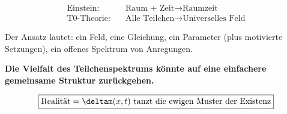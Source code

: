 	\begin{align}
		\text{Einstein:} \quad &\text{Raum + Zeit} \rightarrow \text{Raumzeit} \\
		\text{T0-Theorie:} \quad &\text{Alle Teilchen} \rightarrow \text{Universelles Feld}
	\end{align}
	
	Der Ansatz lautet: ein Feld, eine Gleichung, ein Parameter (plus motivierte Setzungen), ein offenes Spektrum von Anregungen.
	
	\textbf{Die Vielfalt des Teilchenspektrums könnte auf eine einfachere gemeinsame Struktur zurückgehen.}
	
	\begin{equation}
		\boxed{\text{Realität} = \deltam(x,t) \text{ tanzt die ewigen Muster der Existenz}}
		\label{eq:final_truth}
	\end{equation}
	
